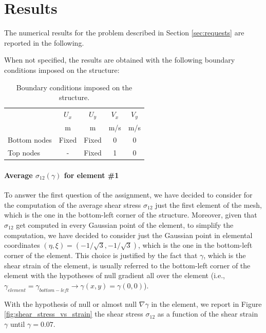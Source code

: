 \section{Results}
\label{sec:results}

The numerical results for the problem described in Section \ref{sec:requests} are reported in the following.

When not specified, the results are obtained with the following boundary conditions imposed on the structure:

\begin{table}[H]
    \centering
    \begin{tabular}{|l|c|c|c|c|}
        \hline
        ~            & $U_x$ & $U_y$ & $V_x$ & $V_y$ \\
        ~            & m     & m     & m/s   & m/s   \\
        \hline
        Bottom nodes & Fixed & Fixed & 0     & 0     \\
        Top nodes    & -     & Fixed & 1     & 0     \\
        \hline
    \end{tabular}
    \caption{Boundary conditions imposed on the structure.}
    \label{tab:boundary_conditions}
\end{table}


\paragraph{Average $\sigma_{12}(\gamma)$ for element \#1}

To answer the first question of the assignment, we have decided to consider for the computation of the average shear stress $\sigma_{12}$ just the first element of the mesh, which is the one in the bottom-left corner of the structure.
Moreover, given that $\sigma_{12}$ get computed in every Gaussian point of the element, to simplify the computation, we have decided to consider just the Gaussian point in elemental coordinates $(\eta, \xi) = (-1/\sqrt{3}, -1/\sqrt{3})$, which is the one in the bottom-left corner of the element.
This choice is justified by the fact that $\gamma$, which is the shear strain of the element, is usually referred to the bottom-left corner of the element with the hypotheses of null gradient all over the element (i.e., $\gamma_{element} = \gamma_{bottom-left} \rightarrow \gamma(x, y) = \gamma(0, 0)$).

With the hypothesis of null or almost null $\nabla \gamma$ in the element, we report in Figure \ref{fig:shear_stress_vs_strain} the shear stress $\sigma_{12}$ as a function of the shear strain $\gamma$ until $\gamma = 0.07$.


